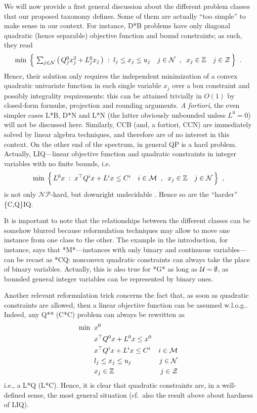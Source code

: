 We will now provide a first general discussion about the different problem classes that our proposed taxonomy defines. Some of them are actually ``too simple'' to make sense in our context. For instance, D*B problems have only diagonal quadratic (hence separable) objective function and bound constraints; as such, they read
\[
 \textstyle
 \min \; \Big\{ \,
 \sum_{j \in \mathcal{N}} \big( \, Q^0_j x_j^2 + L^0_j x_j \, \big) \;:\;
 l_j \leq x_j \leq u_j \quad j \in \mathcal{N} \;\;,\;\;
 x_j \in \mathbb{Z} \quad j \in \mathcal{Z} \, \Big\}
 \;\; .
\]
Hence, their solution only requires the independent minimization of a convex quadratic univariate function in each single variable $x_j$ over a box constraint and possibly integrality requirements: this can be attained trivially in $O(1)$ by closed-form formul{\ae}, projection and rounding arguments. \emph{A fortiori}, the even simpler cases L*B, D*N and L*N (the latter obviously unbounded unless $L^0 = 0$) will not be discussed here. Similarly, CCB (and, a fortiori, CCN) are immediately solved by linear algebra techniques, and therefore are of no interest in this context. On the other end of the spectrum, in general QP is a hard problem. Actually, LIQ---linear objective function and quadratic constraints in integer variables with no finite bounds, i.e. 
\[
 \textstyle
 \min \; \Big\{ \, L^0 x \;:\;
 x^\top Q^i x + L^i x \leq C^i \quad i \in \mathcal{M} \;\;,\;\;
 x_j \in \mathbb{Z} \quad j \in \mathcal{N} \, \Big\}
 \;\; ,
\]
is not only $\mathcal{NP}$-hard, but downright undecidable \cite{jeroslow}. Hence so are the ``harder'' \{C,Q\}IQ.

\smallskip
It is important to note that the relationships between the different classes can be somehow blurred because reformulation techniques may allow to move one instance from one class to the other. The example in the introduction, for instance, says that *M*---instances with only binary and continuous variables---can be recast as *CQ: nonconvex quadratic constraints can always take the place of binary variables. Actually, this is also true for *G* as long as $\mathcal{U} = \emptyset$, as bounded general integer variables can be represented by binary ones.

Another relevant reformulation trick concerns the fact that, as soon as quadratic constraints are allowed, then a linear objective function can be assumed w.l.o.g.. Indeed, any Q** (C*C) problem can always be rewritten as
%
\begin{align*}	
 \min \;\;
 & x^0 \\
 & x^\top Q^0 x + L^0 x \leq x^0 & \\ 
 & x^\top Q^i x + L^i x \leq C^i & i \in \mathcal{M} \\ 
 & l_j \leq x_j \leq u_j & j \in \mathcal{N}  \\
 & x_j \in \mathbb{Z} & j \in \mathcal{Z}
\end{align*}
%
i.e., a L*Q (L*C). Hence, it is clear that quadratic constraints are, in a well-defined sense, the most general situation (cf.~also the result above about hardness of LIQ).

